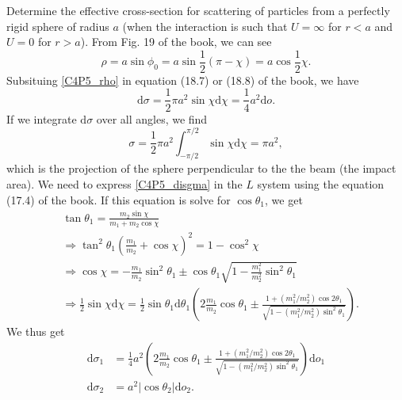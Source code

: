 \begin{problem}
{
Determine the effective cross-section for scattering of particles from a perfectly rigid sphere of radius $a$ (\ie when the interaction is such that $U=\infty$ for $r<a$ and $U=0$ for $r>a$).
}
{
From Fig. 19 of the book, we can see
\begin{equation}
    \rho = a\sin{\phi_0}=a\sin{\frac{1}{2}(\pi-\chi)}=a\cos{\frac{1}{2}\chi}. \label{C4P5_rho}
\end{equation} 
Subsituing \eqref{C4P5_rho} in equation (18.7) or (18.8) of the book, we have
\begin{equation}
    \mathrm{d}\sigma=\frac{1}{2}\pi a^2 \sin{\chi}\mathrm{d}\chi=\frac{1}{4}a^2\mathrm{d}o. \label{C4P5_disgma}
\end{equation}
If we integrate $\mathrm{d}\sigma$ over all angles, we find
\begin{equation*}
    \sigma = \frac{1}{2}\pi a^2  \int_{-\pi/2}^{\pi/2} \sin{\chi}\mathrm{d}\chi =\pi a^2, 
\end{equation*}
which is the projection of the sphere perpendicular to the the beam (\ie the impact area). We need to express \eqref{C4P5_disgma} in the $L$ system using the equation (17.4) of the book. If this equation is solve for $\cos{\theta_1}$, we get
\begin{align*}
    &\tan{\theta_1} = \frac{m_2\sin{\chi}}{m_1+m_2\cos{\chi}}\\
    &\Rightarrow \tan^2{\theta_1}\left( \frac{m_1}{m_2} + \cos{\chi} \right)^2 = 1 - \cos^2{\chi} \\
    &\Rightarrow \cos{\chi} = -\frac{m_1}{m_2}\sin^2{\theta_1} \pm \cos{\theta_1}\sqrt{1-\frac{m_1^2}{m_2^2}\sin^2{\theta_1}} \\
    &\Rightarrow \frac{1}{2}\sin{\chi}\mathrm{d}\chi = \frac{1}{2}\sin{\theta_1} \mathrm{d}\theta_1 \left( 2\frac{m_1}{m_2}\cos{\theta_1} \pm \frac{1+(m_1^2/m_2^2)\cos{2\theta_1}}{\sqrt{1-(m_1^2/m_2^2)\sin^2{\theta_1}}} \right).
\end{align*}
We thus get
}
{
\begin{align*}
    \mathrm{d}\sigma_1 &= \frac{1}{4}a^2\left( 2\frac{m_1}{m_2}\cos{\theta_1} \pm \frac{1+(m_1^2/m_2^2)\cos{2\theta_1}}{\sqrt{1-(m_1^2/m_2^2)\sin^2{\theta_1}}} \right) \mathrm{d}o_1 \\
    \mathrm{d}\sigma_2 &= a^2|\cos{\theta_2}|\mathrm{d}o_2.
\end{align*}
}
\end{problem}


